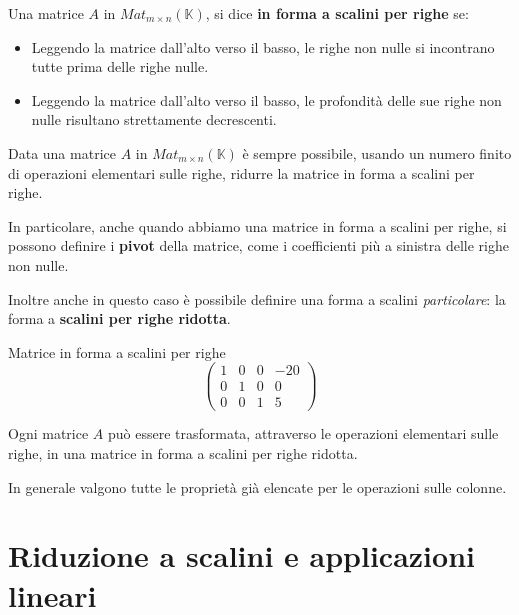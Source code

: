 \begin{definition}
	Una matrice $A$ in $Mat_{m \times n}(\mathbb{K})$, si dice \textbf{in forma
		a scalini per righe} se:
	\begin{itemize}
		\item Leggendo la matrice dall'alto verso il basso, le righe non nulle si
		      incontrano tutte prima delle righe nulle.
		\item Leggendo la matrice dall'alto verso il basso, le profondit\`a
		      delle sue righe non nulle risultano strettamente decrescenti.
	\end{itemize}
\end{definition}

\begin{theorem}
	Data una matrice $A$ in $Mat_{m \times n}(\mathbb{K})$ \`e sempre possibile,
	usando un numero finito di operazioni elementari sulle righe, ridurre la
	matrice in forma a scalini per righe.
\end{theorem}

In particolare, anche quando abbiamo una matrice in forma a scalini per righe, si
possono definire i \textbf{pivot} della matrice, come i coefficienti pi\`u a
sinistra delle righe non nulle.

Inoltre anche in questo caso \`e possibile definire una forma a scalini
\emph{particolare}: la forma a \textbf{scalini per righe ridotta}.

\begin{example}
	Matrice in forma a scalini per righe
	\begin{equation*}
		\begin{pmatrix}
			1 & 0 & 0 & -20 \\
			0 & 1 & 0 & 0   \\
			0 & 0 & 1 & 5
		\end{pmatrix}
	\end{equation*}
\end{example}

\begin{corollary}
	Ogni matrice $A$ pu\`o essere trasformata, attraverso le operazioni elementari
	sulle righe, in una matrice in forma a scalini per righe ridotta.
\end{corollary}

In generale valgono tutte le propriet\`a gi\`a elencate per le operazioni sulle
colonne.

\section{Riduzione a scalini e applicazioni lineari}

